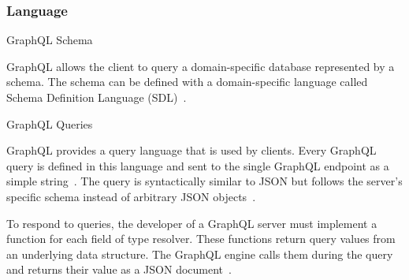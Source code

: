 \begin{frame}\frametitle{Language}

\begin{block}{GraphQL Schema}

GraphQL allows the client to query a domain-specific database represented by a schema. The schema can be defined with a domain-specific language called Schema Definition Language (SDL)~\cite{migrating-to-gql,gql-on-graph-db}.


\end{block}

\begin{block}{GraphQL Queries}

GraphQL provides a query language that is used by clients. Every GraphQL query is defined in this language and sent to the single GraphQL endpoint as a simple string~\cite{migrating-to-gql,real-time-sys-arc-based-on-gql}.
The query is syntactically similar to JSON but follows the server's specific schema instead of arbitrary JSON objects~\cite{gql-on-graph-db,initial-analysis-of-gql}. 


To respond to queries, the developer of a GraphQL server must implement a function for each field of type resolver. These functions return query values from an underlying data structure.  The GraphQL engine calls them during the query and returns their value as a JSON document~\cite{migrating-to-gql,real-time-sys-arc-based-on-gql}. 


\end{block}

\end{frame}

